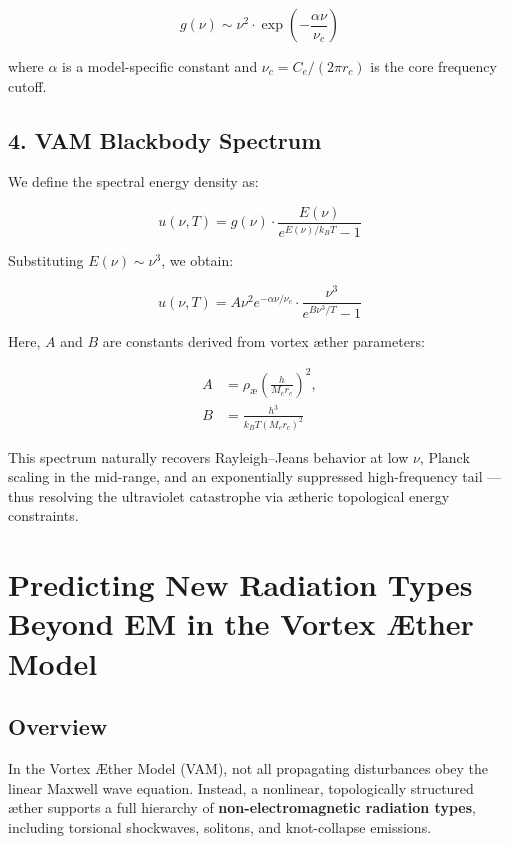 \documentclass[12pt]{article}
\begin{document}
\begin{equation}
g(\nu) \sim \nu^2 \cdot \exp\left(-\frac{\alpha \nu}{\nu_c}\right)
\end{equation}

where \( \alpha \) is a model-specific constant and \( \nu_c = C_e / (2\pi r_c) \) is the core frequency cutoff.

\subsection*{4. VAM Blackbody Spectrum}

We define the spectral energy density as:

\begin{equation}
u(\nu, T) = g(\nu) \cdot \frac{E(\nu)}{e^{E(\nu)/k_B T} - 1}
\end{equation}

Substituting \( E(\nu) \sim \nu^3 \), we obtain:

\begin{equation}
\boxed{
u(\nu, T) = A \nu^2 e^{-\alpha \nu/\nu_c} \cdot
\frac{\nu^3}{e^{B \nu^3 / T} - 1}
}
\end{equation}

Here, \( A \) and \( B \) are constants derived from vortex æther parameters:

\begin{align}
A &= \rho_\text{\ae} \left( \frac{h}{M_e r_c} \right)^2, \\
B &= \frac{h^3}{k_B T \left(M_e r_c\right)^2}
\end{align}

This spectrum naturally recovers Rayleigh–Jeans behavior at low \( \nu \), Planck scaling in the mid-range, and an exponentially suppressed high-frequency tail — thus resolving the ultraviolet catastrophe via ætheric topological energy constraints.

\section{Predicting New Radiation Types Beyond EM in the Vortex \AE{}ther Model}

\subsection*{Overview}

In the Vortex \AE{}ther Model (VAM), not all propagating disturbances obey the linear Maxwell wave equation. Instead, a nonlinear, topologically structured \ae{}ther supports a full hierarchy of \textbf{non-electromagnetic radiation types}, including torsional shockwaves, solitons, and knot-collapse emissions.
\end{document}
